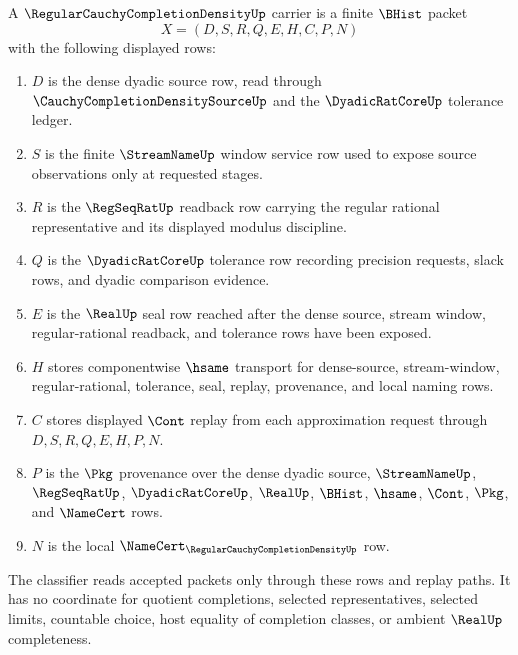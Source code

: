 \begin{definition}
\label{def:regular-cauchy-completion-density-carrier}
A $\RegularCauchyCompletionDensityUp$ carrier is a finite $\BHist$ packet
$$
X=(D,S,R,Q,E,H,C,P,N)
$$
with the following displayed rows:
\begin{enumerate}
\item $D$ is the dense dyadic source row, read through $\CauchyCompletionDensitySourceUp$ and the $\DyadicRatCoreUp$ tolerance ledger.
\item $S$ is the finite $\StreamNameUp$ window service row used to expose source observations only at requested stages.
\item $R$ is the $\RegSeqRatUp$ readback row carrying the regular rational representative and its displayed modulus discipline.
\item $Q$ is the $\DyadicRatCoreUp$ tolerance row recording precision requests, slack rows, and dyadic comparison evidence.
\item $E$ is the $\RealUp$ seal row reached after the dense source, stream window, regular-rational readback, and tolerance rows have been exposed.
\item $H$ stores componentwise $\hsame$ transport for dense-source, stream-window, regular-rational, tolerance, seal, replay, provenance, and local naming rows.
\item $C$ stores displayed $\Cont$ replay from each approximation request through $D,S,R,Q,E,H,P,N$.
\item $P$ is the $\Pkg$ provenance over the dense dyadic source, $\StreamNameUp$, $\RegSeqRatUp$, $\DyadicRatCoreUp$, $\RealUp$, $\BHist$, $\hsame$, $\Cont$, $\Pkg$, and $\NameCert$ rows.
\item $N$ is the local $\NameCert_{\RegularCauchyCompletionDensityUp}$ row.
\end{enumerate}
The classifier reads accepted packets only through these rows and replay paths. It has no coordinate for quotient completions, selected representatives, selected limits, countable choice, host equality of completion classes, or ambient $\RealUp$ completeness.
\end{definition}

